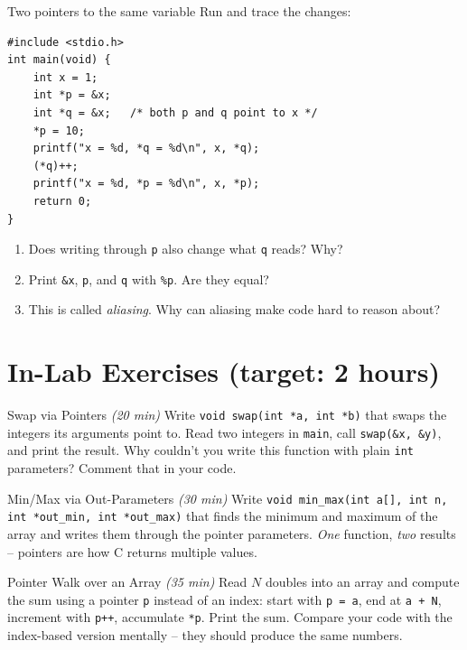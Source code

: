 \documentclass[11pt]{article}
\begin{document}
\begin{tryit}{Two pointers to the same variable}
Run and trace the changes:
\begin{lstlisting}
#include <stdio.h>
int main(void) {
    int x = 1;
    int *p = &x;
    int *q = &x;   /* both p and q point to x */
    *p = 10;
    printf("x = %d, *q = %d\n", x, *q);
    (*q)++;
    printf("x = %d, *p = %d\n", x, *p);
    return 0;
}
\end{lstlisting}
\begin{enumerate}[nosep,leftmargin=*]
  \item Does writing through \texttt{p} also change what \texttt{q} reads? Why?
  \item Print \texttt{\&x}, \texttt{p}, and \texttt{q} with \texttt{\%p}. Are they equal?
  \item This is called \emph{aliasing}. Why can aliasing make code hard to reason about?
\end{enumerate}
\end{tryit}

\section*{In-Lab Exercises (target: 2 hours)}

\begin{labexercise}{Swap via Pointers \hfill {\small \itshape (20 min)}}
Write \texttt{void swap(int *a, int *b)} that swaps the integers its arguments point to.
Read two integers in \texttt{main}, call \texttt{swap(\&x, \&y)}, and print the result.
Why couldn't you write this function with plain \texttt{int} parameters? Comment that in your code.
\end{labexercise}

\begin{labexercise}{Min/Max via Out-Parameters \hfill {\small \itshape (30 min)}}
Write \texttt{void min\_max(int a[], int n, int *out\_min, int *out\_max)} that
finds the minimum and maximum of the array and writes them through the pointer
parameters. \emph{One} function, \emph{two} results -- pointers are how C returns multiple values.
\end{labexercise}

\begin{labexercise}{Pointer Walk over an Array \hfill {\small \itshape (35 min)}}
Read $N$ doubles into an array and compute the sum using a pointer \texttt{p} instead of
an index: start with \texttt{p = a}, end at \texttt{a + N}, increment with \texttt{p++},
accumulate \texttt{*p}. Print the sum. Compare your code with the index-based version
mentally -- they should produce the same numbers.
\end{labexercise}
\end{document}
